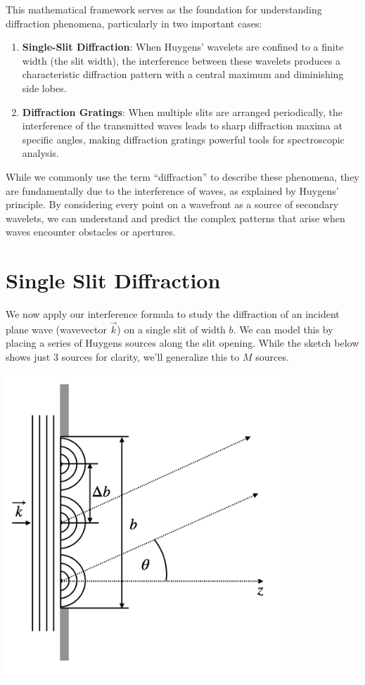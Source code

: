 \documentclass[
  a4paper,
]{book}
\begin{document}
This mathematical framework serves as the foundation for understanding
diffraction phenomena, particularly in two important cases:

\begin{enumerate}
\def\labelenumi{\arabic{enumi}.}
\item
  \textbf{Single-Slit Diffraction}: When Huygens' wavelets are confined
  to a finite width (the slit width), the interference between these
  wavelets produces a characteristic diffraction pattern with a central
  maximum and diminishing side lobes.
\item
  \textbf{Diffraction Gratings}: When multiple slits are arranged
  periodically, the interference of the transmitted waves leads to sharp
  diffraction maxima at specific angles, making diffraction gratings
  powerful tools for spectroscopic analysis.
\end{enumerate}

While we commonly use the term ``diffraction'' to describe these
phenomena, they are fundamentally due to the interference of waves, as
explained by Huygens' principle. By considering every point on a
wavefront as a source of secondary wavelets, we can understand and
predict the complex patterns that arise when waves encounter obstacles
or apertures.

\section{Single Slit Diffraction}\label{single-slit-diffraction}

We now apply our interference formula to study the diffraction of an
incident plane wave (wavevector \(\vec{k}\)) on a single slit of width
\(b\). We can model this by placing a series of Huygens sources along
the slit opening. While the sketch below shows just 3 sources for
clarity, we'll generalize this to \(M\) sources.

\begin{center}
\includegraphics[width=4.16667in,height=\textheight,keepaspectratio]{wave-optics/img/single_slit.png}
\end{center}
\end{document}
